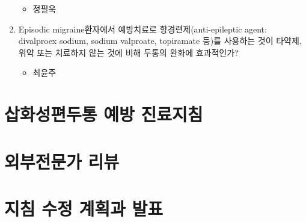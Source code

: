 \documentclass[]{book}
\providecommand{\tightlist}{%
  \setlength{\itemsep}{0pt}\setlength{\parskip}{0pt}}
\begin{document}
\begin{enumerate}
  \begin{itemize}
  \tightlist
  \item
    정필욱
  \end{itemize}
\item
  Episodic migraine환자에서 예방치료로 항경련제(anti-epileptic agent: divalproex sodium, sodium valproate, topiramate 등)를 사용하는 것이 타약제, 위약 또는 치료하지 않는 것에 비해 두통의 완화에 효과적인가?

  \begin{itemize}
  \tightlist
  \item
    최윤주
  \end{itemize}
\end{enumerate}

\hypertarget{section-20}{%
\chapter{삽화성편두통 예방 진료지침}\label{section-20}}

\hypertarget{section-21}{%
\chapter{외부전문가 리뷰}\label{section-21}}

\hypertarget{section-22}{%
\chapter{지침 수정 계획과 발표}\label{section-22}}


\end{document}
